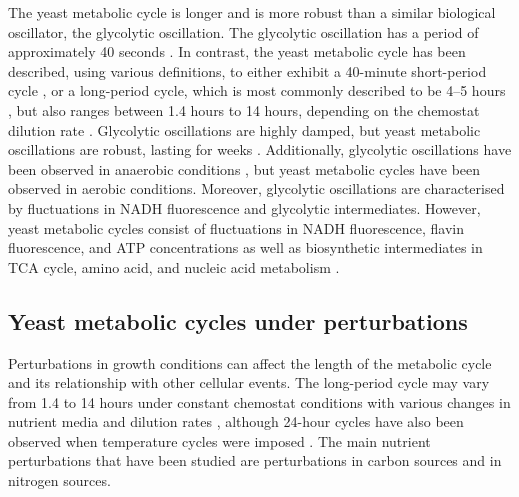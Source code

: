 The yeast metabolic cycle is longer and is more robust than a similar biological oscillator, the glycolytic oscillation.
The glycolytic oscillation has a period of approximately 40 seconds \parencite{olsenRegulationGlycolyticOscillations2009}.
In contrast, the yeast metabolic cycle has been described, using various definitions, to either exhibit a 40-minute short-period cycle \parencite{lloydUltradianMetronomeTimekeeper2005, liRapidGenomescaleResponse2006, lloydRedoxRhythmicityClocks2007}, or a long-period cycle, which is most commonly described to be 4--5 hours \parencite{tuLogicYeastMetabolic2005, tuCyclicChangesMetabolic2007}, but also ranges between 1.4 hours to 14 hours, depending on the chemostat dilution rate \parencite{beuseEffectDilutionRate1998}.
Glycolytic oscillations are highly damped, but yeast metabolic oscillations are robust, lasting for weeks \parencite{lloydRedoxRhythmicityClocks2007}.
Additionally, glycolytic oscillations have been observed in anaerobic conditions \parencite{lloydSaccharomycesCerevisiaeOscillatory2019}, but yeast metabolic cycles have been observed in aerobic conditions.
Moreover, glycolytic oscillations are characterised by fluctuations in NADH fluorescence and glycolytic intermediates.
However, yeast metabolic cycles consist of fluctuations in NADH fluorescence, flavin fluorescence, and ATP concentrations as well as biosynthetic intermediates in TCA cycle, amino acid, and nucleic acid metabolism \parencite{tuCyclicChangesMetabolic2007}.


\subsection{Yeast metabolic cycles under perturbations}
\label{subsec:intro-ymc-perturbations}

Perturbations in growth conditions can affect the length of the metabolic cycle and its relationship with other cellular events.
The long-period cycle may vary from 1.4 to 14 hours under constant chemostat conditions with various changes in nutrient media and dilution rates \parencite{caustonMetabolicRhythmsFramework2018}, although 24-hour cycles have also been observed when temperature cycles were imposed \parencite{eelderink-chenCircadianClockSaccharomyces2010}.
The main nutrient perturbations that have been studied are perturbations in carbon sources and in nitrogen sources.

